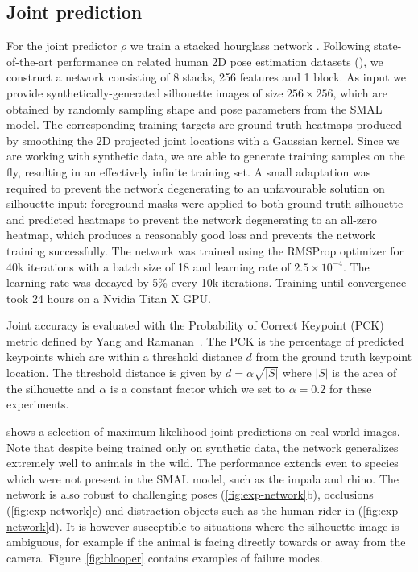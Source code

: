 \subsection{Joint prediction}
\label{sec:exp-network}
For the joint predictor $\rho$ we train a stacked hourglass network \cite{newell2016stacked}. Following state-of-the-art performance on related human 2D pose estimation datasets (\cite{andriluka14cvpr,lin2014microsoft}), we construct a network consisting of 8 stacks, 256 features and 1 block. As input we provide synthetically-generated silhouette images of size $256\times 256$, which are obtained by randomly sampling shape and pose parameters from the SMAL model. The corresponding training targets are ground truth heatmaps produced by smoothing the 2D projected joint locations with a Gaussian kernel. Since we are working with synthetic data, we are able to generate training samples on the fly, resulting in an effectively infinite training set. A small adaptation was required to prevent the network degenerating to an unfavourable solution on silhouette input: foreground masks were applied to both ground truth silhouette and predicted heatmaps to prevent the network degenerating to an all-zero heatmap, which produces a reasonably good loss and prevents the network training successfully. The network was trained using the RMSProp optimizer for 40k iterations with a batch size of 18 and learning rate of $2.5\times 10^{-4}$. The learning rate was decayed by 5\% every 10k iterations. Training until convergence took 24 hours on a Nvidia Titan X GPU.

Joint accuracy is evaluated with the Probability of Correct Keypoint (PCK) metric defined by Yang and Ramanan~\cite{yang2013articulated}. The PCK is the percentage of predicted keypoints which are within a threshold distance $d$ from the ground truth keypoint location. The threshold distance is given by $d=\alpha\sqrt{|S|}$ where $|S|$ is the area of the silhouette and $\alpha$ is a constant factor which we set to $\alpha=0.2$ for these experiments.

 shows a selection of maximum likelihood joint predictions on real world images. Note that despite being trained only on synthetic data, the network generalizes extremely well to animals in the wild. The performance extends even to species which were not present in the SMAL model, such as the impala and rhino. The network is also robust to challenging poses (\ref{fig:exp-network}b), occlusions (\ref{fig:exp-network}c) and distraction objects such as the human rider in (\ref{fig:exp-network}d). It is however susceptible to situations where the silhouette image is ambiguous, for example if the animal is facing directly towards or away from the camera. Figure~\ref{fig:blooper} contains examples of failure modes.

